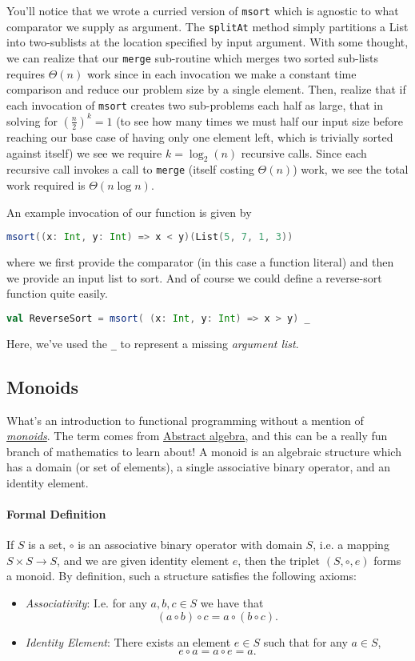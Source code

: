 \documentclass[12pt,letterpaper,twoside]{article}
\begin{document}
You'll notice that we wrote a curried version of \texttt{msort} which is agnostic to
what comparator we supply as argument.
The \texttt{splitAt} method simply partitions a List into two-sublists at
the location specified by input argument. With some thought, we can realize that
our \texttt{merge} sub-routine which merges two sorted sub-lists requires 
$\Theta(n)$  work since in each invocation we make a constant time comparison and
reduce our problem size by a single element. Then, realize that if each invocation
of \texttt{msort} creates two sub-problems each half as large, that in solving for
$\left(\frac{n}{2}\right)^k = 1$ (to see how many times we must half our input size before
reaching our base case of having only one element left, which is trivially sorted against
itself) we see we require $k = \log_2(n)$ recursive calls. Since each recursive call
invokes a call to \texttt{merge} (itself costing $\Theta(n)$) work, we see the total
work required is $\Theta(n \log n)$.

An example invocation of our function is given by
\begin{lstlisting}[language=Scala]
msort((x: Int, y: Int) => x < y)(List(5, 7, 1, 3)) \end{lstlisting}
where we first provide the comparator (in this case a function literal) and then we provide
an input list to sort.
And of course we could define a reverse-sort function quite easily.
\begin{lstlisting}[language=Scala]
val ReverseSort = msort( (x: Int, y: Int) => x > y) _ \end{lstlisting}
Here, we've used the \texttt{\_} to represent a missing \emph{argument list}.

\subsection{Monoids} 
What's an introduction to functional programming without a mention of 
\href{https://en.wikipedia.org/wiki/Monoid}{\emph{monoids}}.
The term comes from 
\href{https://en.wikipedia.org/wiki/Abstract_algebra}{Abstract algebra},
and this can be a really fun branch of mathematics to learn about!
A monoid is an algebraic structure which has a domain (or set of elements),
a single associative binary operator, and an identity element.

\paragraph{Formal Definition} If $S$ is a set, 
$\circ$ is an associative binary operator with domain $S$,
i.e. a mapping $S \times S \to S$, and we are given identity element
$e$, then the triplet $(S, \circ, e)$ forms a monoid. By definition,
such a structure satisfies the following axioms:
\begin{itemize}   \item \emph{Associativity}: I.e. for any $a,b, c \in S$ we have that
    \[
      (a \circ b) \circ c = a \circ (b \circ c).
    \]
  \item \emph{Identity Element}: There exists an element $e \in S$ such
    that for any $a \in S$, 
    \[
      e \circ a = a \circ e = a.
    \] \end{itemize}
\end{document}
